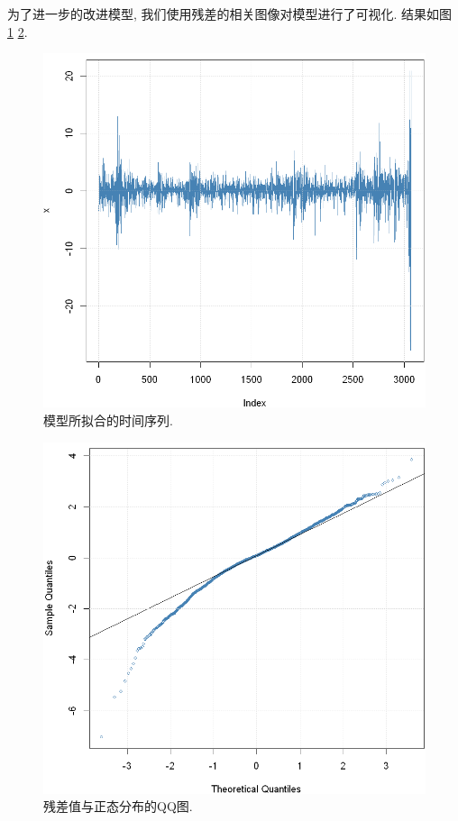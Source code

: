 \documentclass[11pt]{article}
\begin{document}
\qquad 为了进一步的改进模型, 我们使用残差的相关图像对模型进行了可视化. 结果如图 \ref{fig:13} \ref{fig:14}.
\begin{center}
    \hspace{30pt}\begin{minipage}{0.45\textwidth}
        \begin{figure}
            \centering
            \hspace{-25pt}\includegraphics[width=.9\textwidth]{output_36_0}
            \caption{模型所拟合的时间序列.\label{fig:13}}
        \end{figure}
    \end{minipage}
    \begin{minipage}{0.45\textwidth}
        \begin{figure}
            \centering
            \hspace{-25pt}\includegraphics[width=.9\textwidth]{output_37_0}
            \caption{残差值与正态分布的QQ图.\label{fig:14}}
        \end{figure}
    \end{minipage}
\end{center}
    
\end{document}
